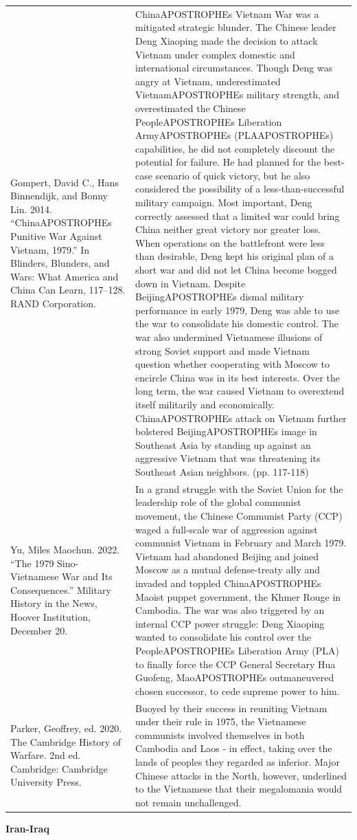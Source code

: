 {\begin{longtable}{p{}p{}}
\\
Gompert, David C., Hans Binnendijk, and Bonny Lin. 2014. “ChinaAPOSTROPHEs Punitive War Against Vietnam, 1979.” In Blinders, Blunders, and Wars: What America and China Can Learn, 117–128. RAND Corporation. & ChinaAPOSTROPHEs Vietnam War was a mitigated strategic blunder. The Chinese leader Deng Xiaoping made the decision to attack Vietnam under complex domestic and international circumstances. Though Deng was angry at Vietnam, underestimated VietnamAPOSTROPHEs military strength, and overestimated the Chinese PeopleAPOSTROPHEs Liberation ArmyAPOSTROPHEs (PLAAPOSTROPHEs) capabilities, he did not completely discount the potential for failure. He had planned for the best-case scenario of quick victory, but he also considered the possibility of a less-than-successful military campaign. Most important, Deng correctly assessed that a limited war could bring China neither great victory nor greater loss. When operations on the battlefront were less than desirable, Deng kept his original plan of a short war and did not let China become bogged down in Vietnam. Despite BeijingAPOSTROPHEs dismal military performance in early 1979, Deng was able to use the war to consolidate his domestic control. The war also undermined Vietnamese illusions of strong Soviet support and made Vietnam question whether cooperating with Moscow to encircle China was in its best interests. Over the long term, the war caused Vietnam to overextend itself militarily and economically. ChinaAPOSTROPHEs attack on Vietnam further bolstered BeijingAPOSTROPHEs image in Southeast Asia by standing up against an aggressive Vietnam that was threatening its Southeast Asian neighbors. (pp. 117-118)
\\
Yu, Miles Maochun. 2022. “The 1979 Sino-Vietnamese War and Its Consequences.” Military History in the News, Hoover Institution, December 20. & In a grand struggle with the Soviet Union for the leadership role of the global communist movement, the Chinese Communist Party (CCP) waged a full-scale war of aggression against communist Vietnam in February and March 1979. Vietnam had abandoned Beijing and joined Moscow as a mutual defense-treaty ally and invaded and toppled ChinaAPOSTROPHEs Maoist puppet government, the Khmer Rouge in Cambodia. The war was also triggered by an internal CCP power struggle: Deng Xiaoping wanted to consolidate his control over the PeopleAPOSTROPHEs Liberation Army (PLA) to finally force the CCP General Secretary Hua Guofeng, MaoAPOSTROPHEs outmaneuvered chosen successor, to cede supreme power to him.
\\
Parker, Geoffrey, ed. 2020. The Cambridge History of Warfare. 2nd ed. Cambridge: Cambridge University Press. & Buoyed by their success in reuniting Vietnam under their rule in 1975, the Vietnamese communists involved themselves in both Cambodia and Laos - in effect, taking over the lands of peoples they regarded as inferior. Major Chinese attacks in the North, however, underlined to the Vietnamese that their megalomania would not remain unchallenged.
\\
\end{longtable}}
\clearpage
         \textbf{Iran-Iraq} 

